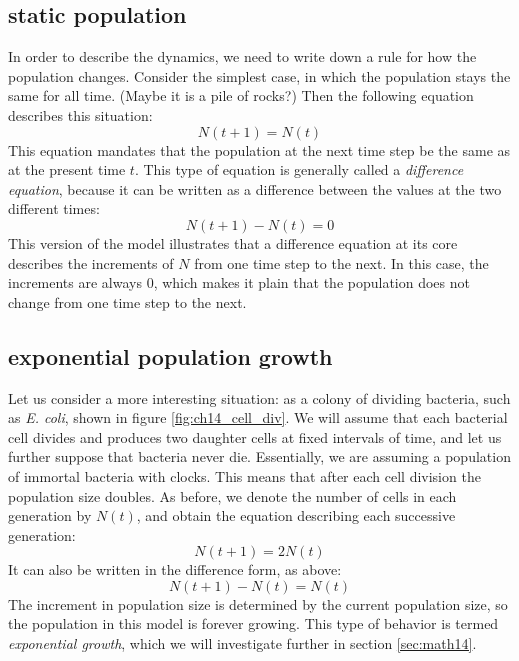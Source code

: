 \documentclass[
]{book}
\theoremstyle{definition}
\theoremstyle{definition}
\theoremstyle{definition}
\theoremstyle{remark}
\begin{document}
\hypertarget{static-population}{%
\subsection{static population}\label{static-population}}

In order to describe the dynamics, we need to write down a rule for how the population changes. Consider the simplest case, in which the population stays the same for all time. (Maybe it is a pile of rocks?) Then the following equation describes this situation:
\[N(t+1) = N(t) \]
This equation mandates that the population at the next time step be the same as at the present time \(t\). This type of equation is generally called a  \emph{difference equation}, because it can be written as a difference between the values at the two different times:
\[N(t+1) - N(t) = 0\]
This version of the model illustrates that a difference equation at its core describes the increments of \(N\) from one time step to the next. In this case, the increments are always 0, which makes it plain that the population does not change from one time step to the next.

\hypertarget{exponential-population-growth}{%
\subsection{exponential population growth}\label{exponential-population-growth}}

Let us consider a more interesting situation: as a colony of dividing bacteria, such as \emph{E. coli}, shown in figure \ref{fig:ch14_cell_div}. We will assume that each bacterial cell divides and produces two daughter cells at fixed intervals of time, and let us further suppose that bacteria never die. Essentially, we are assuming a population of immortal bacteria with clocks. This means that after each cell division the population size doubles. As before, we denote the number of cells in each generation by \(N(t)\), and obtain the equation describing each successive generation:
\[ N(t+1) = 2N(t)\]
It can also be written in the difference form, as above:
\[ N(t+1) - N(t) = N(t) \]
The increment in population size is determined by the current population size, so the population in this model is forever growing. This type of behavior is termed   \emph{exponential growth}, which we will investigate further in section \ref{sec:math14}.
\end{document}

